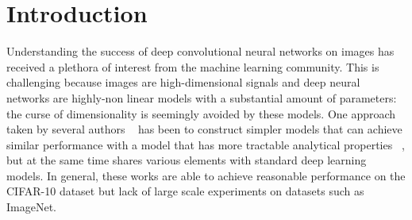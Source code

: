 \documentclass{article}
\begin{document}
\section{Introduction}
Understanding the success of deep convolutional neural networks on images has received a plethora of interest from the machine learning community. 
This is challenging because images are high-dimensional signals and deep neural networks are highly-non linear models  with a substantial amount of parameters: the curse of dimensionality is seemingly avoided by these models. One approach taken by several authors ~\citep{mairal2016end,li2019enhanced,shankar2020neural,lu2014scale}  has been to construct simpler models that can achieve similar performance with a model that has more tractable analytical properties ~\citep{jacot2018neural,rahimi2008random}, but  at the same time shares various elements with standard deep learning models. In general, these works are able to achieve reasonable performance on the CIFAR-10 dataset but lack of large scale experiments on datasets such as ImageNet.

\end{document}
